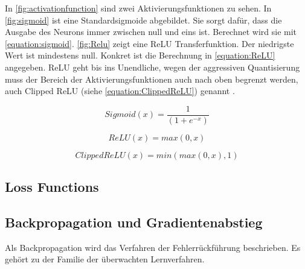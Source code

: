 In \autoref{fig:activationfunction} sind zwei Aktivierungsfunktionen zu sehen. In \autoref{fig:sigmoid} ist eine Standardsigmoide abgebildet. Sie sorgt dafür, dass die Ausgabe des Neurons immer zwischen null und eins ist. Berechnet wird sie mit \autoref{equation:sigmoid}. \autoref{fig:Relu} zeigt eine \ac{ReLU} Transferfunktion. Der niedrigste Wert ist mindestens null. Konkret ist die Berechnung in \autoref{equation:ReLU} angegeben. \ac{ReLU} geht bis ins Unendliche, wegen der aggressiven Quantisierung muss der Bereich der Aktivierungsfunktionen auch nach oben begrenzt werden, auch Clipped \ac{ReLU} (siehe \autoref{equation:ClippedReLU}) genannt \cite{StockfishNNUE}.

\begin{equation}
  Sigmoid(x)=\frac{1}{(1+e^{-x})}
  \label{equation:sigmoid}
\end{equation}

\begin{equation}
  ReLU(x)=max(0,x)
  \label{equation:ReLU}
\end{equation}

\begin{equation}
  ClippedReLU(x)=min(max(0,x),1)
  \label{equation:ClippedReLU}
\end{equation}

\subsection{Loss Functions}


\subsection{Backpropagation und Gradientenabstieg}
Als Backpropagation wird das Verfahren der Fehlerrückführung beschrieben. Es gehört zu der Familie der überwachten Lernverfahren. 






